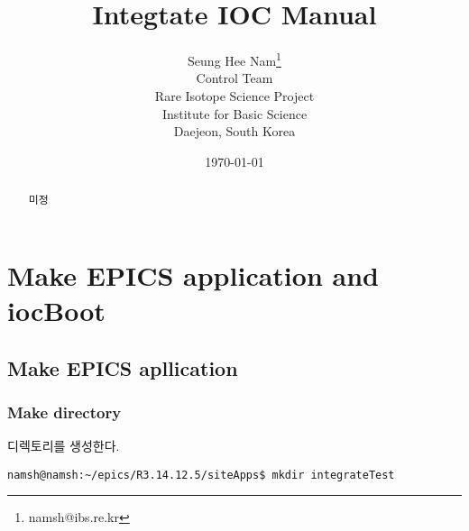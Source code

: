 \documentclass[11pt
  , a4paper
  , article
  , oneside
]{memoir}
\begin{document}
\newcommand{\technumber}{
  RAON Control-Document Series\\
  Revision : v0.1,   Release : 2015.05.08}
\title{\textbf{Integtate IOC Manual}}


\author{Seung Hee Nam\thanks{namsh@ibs.re.kr} \\
  Control Team \\
  Rare Isotope Science Project\\
  Institute for Basic Science\\
  Daejeon, South Korea
}

\date{\today}

\renewcommand{\maketitlehooka}{\begin{flushright}\textsf{\technumber}\end{flushright}}

\maketitle

\begin{abstract}
미정
\end{abstract}



\chapter{Make EPICS application and iocBoot}

\section{Make EPICS apllication}
\subsection{Make directory}
디렉토리를 생성한다.
\begin{lstlisting}[style=termstyle]
namsh@namsh:~/epics/R3.14.12.5/siteApps$ mkdir integrateTest
\end{lstlisting}
\end{document}
